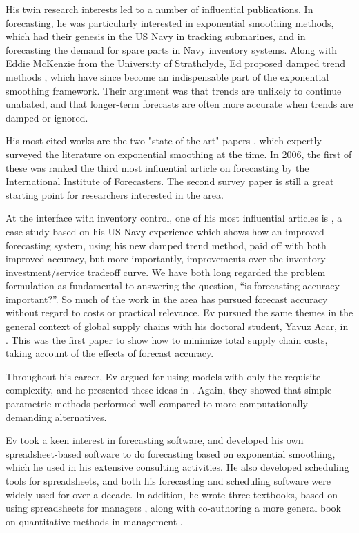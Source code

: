 \documentclass[11pt, a4paper]{article}
\begin{document}
His twin research interests led to a number of influential publications. In forecasting, he was particularly interested in exponential smoothing methods, which had their genesis in the US Navy in tracking submarines, and in forecasting the demand for spare parts in Navy inventory systems. Along with Eddie McKenzie from the University of Strathclyde, Ed proposed damped trend methods \citep{Gardner1985-lk,Gardner1989-bi}, which have since become an indispensable part of the exponential smoothing framework. Their argument was that trends are unlikely to continue unabated, and that longer-term forecasts are often more accurate when trends are damped or ignored.

His most cited works are the two "state of the art" papers \citep{Gardner1985-yu,Gardner2006-qq}, which expertly surveyed the literature on exponential smoothing at the time. In 2006, the first of these was ranked the third most influential article on forecasting by the International Institute of Forecasters. The second survey paper is still a great starting point for researchers interested in the area.

At the interface with inventory control, one of his most influential articles is \citet{Gardner1990-pw}, a case study based on his US Navy experience which shows how an  improved forecasting system, using his new damped trend method, paid off with both improved accuracy, but more importantly, improvements over the inventory investment/service tradeoff curve. We have both long regarded the problem formulation as fundamental to answering the question, ``is forecasting accuracy important?''. So much of the work in the area has pursued forecast accuracy without regard to costs or practical relevance. Ev pursued the same themes in the general context of global supply chains with his doctoral student, Yavuz Acar, in \citet{Acar2012ForecastingMS}. This was the first paper to show how to minimize total supply chain costs, taking account of the effects of forecast accuracy.

Throughout his career, Ev argued for using models with only the requisite complexity, and he presented these ideas in \citet{Syntetos2015ForecastingII}. Again, they showed that simple parametric methods performed well compared to more computationally demanding alternatives.

Ev took a keen interest in forecasting software, and developed his own spreadsheet-based software to do forecasting based on exponential smoothing, which he used in his extensive consulting activities. He also developed scheduling tools for spreadsheets, and both his forecasting and scheduling software were widely used for over a decade. In addition, he wrote three textbooks, based on using spreadsheets for managers \citep{book92,book93,book94}, along with co-authoring a more general book on quantitative methods in management \citep{book95}.
\end{document}

